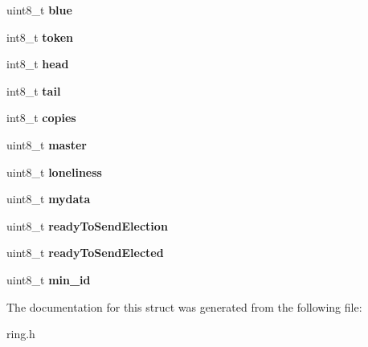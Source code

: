 \begin{DoxyCompactItemize}
uint8\+\_\+t {\bfseries blue}
\item 
\mbox{\label{struct_u_s_e_r_d_a_t_a_a3619e94831011bb986fa7216cb1b369b}} 
int8\+\_\+t {\bfseries token}
\item 
\mbox{\label{struct_u_s_e_r_d_a_t_a_a8a32b4c469b00e122b082126e5320efc}} 
int8\+\_\+t {\bfseries head}
\item 
\mbox{\label{struct_u_s_e_r_d_a_t_a_a3ae6e13018f158fda78fe1c15311c201}} 
int8\+\_\+t {\bfseries tail}
\item 
\mbox{\label{struct_u_s_e_r_d_a_t_a_a5595b119f783a7b643a13fdd898c19a6}} 
int8\+\_\+t {\bfseries copies}
\item 
\mbox{\label{struct_u_s_e_r_d_a_t_a_acf2b713ec894a3aaf5f96513eea5c137}} 
uint8\+\_\+t {\bfseries master}
\item 
\mbox{\label{struct_u_s_e_r_d_a_t_a_a504e6f947bfaaf172c002e9a8d2e49f1}} 
uint8\+\_\+t {\bfseries loneliness}
\item 
\mbox{\label{struct_u_s_e_r_d_a_t_a_adb4e92a925af775e3d29af1f7ebbe733}} 
uint8\+\_\+t {\bfseries mydata}
\item 
\mbox{\label{struct_u_s_e_r_d_a_t_a_a60a12ef83a2f7430cb9b324504474c89}} 
uint8\+\_\+t {\bfseries ready\+To\+Send\+Election}
\item 
\mbox{\label{struct_u_s_e_r_d_a_t_a_a2f0a8b53dd3c1940c89f9e0bd1458546}} 
uint8\+\_\+t {\bfseries ready\+To\+Send\+Elected}
\item 
\mbox{\label{struct_u_s_e_r_d_a_t_a_a5e6aae6522176125f4d02bba8ca5fe0c}} 
uint8\+\_\+t {\bfseries min\+\_\+id}
\end{DoxyCompactItemize}


The documentation for this struct was generated from the following file\+:\begin{DoxyCompactItemize}
\item 
ring.\+h\end{DoxyCompactItemize}
